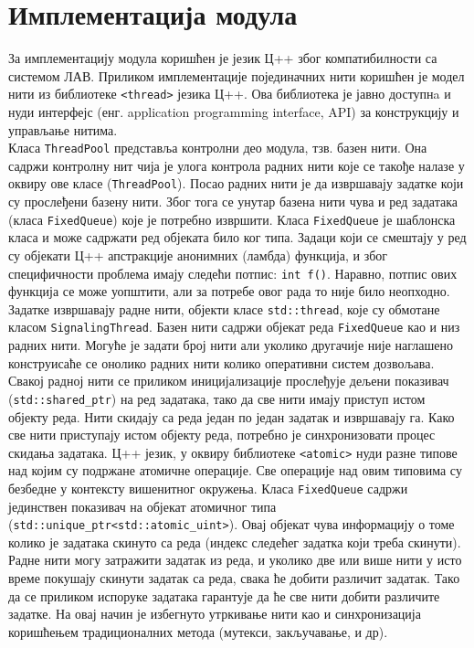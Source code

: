 \documentclass[12pt,oneside]{memoir}
\begin{document}
\section{Имплементација модула}
За имплементацију модула коришћен је језик Ц++ због компатибилности са системом ЛАВ. Приликом имплементације појединачних нити коришћен је модел нити из библиотеке \texttt{<thread>} језика Ц++. Ова библиотека је јавно доступнa и нуди интерфејс (енг. application programming interface, API) за конструкцију и управљање нитима.
\\ \indent 
Класа \texttt{ThreadPool} представља контролни део модула, тзв. базен нити. Она садржи контролну нит чија је улога контрола радних нити које се такође налазе у оквиру ове класе (\texttt{ThreadPool}). Посао радних нити је да извршавају задатке који су прослеђени базену нити. Због тога се унутар базена нити чува и ред задатака (класа \texttt{FixedQueue}) које је потребно извршити. Класа \texttt{FixedQueue} је шаблонска класа и може садржати ред објеката било ког типа. Задаци који се смештају у ред су објекати Ц++ апстракције анонимних (ламбда) функција, и због специфичности проблема имају следећи потпис: \texttt{int f()}. Наравно, потпис ових функција се може уопштити, али за потребе овог рада то није било неопходно. 
\\ \indent 
 Задатке извршавају радне нити, објекти класе \texttt{std::thread}, које су обмотане класом \texttt{SignalingThread}.
Базен нити садржи објекат реда \texttt{FixedQueue} као и низ радних нити. Могуће је задати број нити али уколико другачије није наглашено конструисаће се онолико радних нити колико оперативни систем дозвољава.
 \\ \indent
Свакој радној нити се приликом иницијализације прослеђује дељени показивач (\texttt{std::shared\_ptr}) на ред задатака, тако да све нити имају приступ истом објекту реда. Нити скидају са реда један по један задатак и извршавају га. Како све нити приступају истом објекту реда, потребно је синхронизовати процес скидања задатака. Ц++ језик, у оквиру библиотеке \texttt{<atomic>} нуди разне типове над којим су подржане атомичне операције. Све операције над овим типовима су безбедне у контексту вишенитног окружења. Класа \texttt{FixedQueue} садржи јединствен показивач на објекат атомичног типа (\texttt{std::unique\_ptr<std::atomic\_uint>}). Овај објекат чува информацију о томе колико је задатака скинуто са реда (индекс следећег задатка који треба скинути). Радне нити могу затражити задатак из реда, и уколико две или више нити у исто време покушају скинути задатак са реда, свака ће добити различит задатак. Тако да се приликом испоруке задатака гарантује да ће све нити добити различите задатке.  На овај начин је избегнуто утркивање нити као и синхронизација коришћењем традиционалних метода (мутекси, закључавање, и др). 
\end{document}
